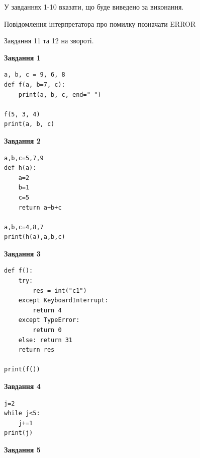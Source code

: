 \documentclass[12pt, ukrainian]{article}
\begin{document}
{{{{{{{{{У завданнях 1-10 вказати, що буде виведено за виконання.

Повідомлення інтерпретатора про помилку позначати ERROR

Завдання 11 та 12 на звороті.

\begin{minipage}[t]{7.5cm}

\begin{center}
\textbf{Завдання 1}
\end{center}

\begin{verbatim}
a, b, c = 9, 6, 8
def f(a, b=7, c):
    print(a, b, c, end=" ")

f(5, 3, 4)
print(a, b, c)
\end{verbatim}



\begin{center}
\textbf{Завдання 2}
\end{center}

\begin{verbatim}
a,b,c=5,7,9
def h(a):
    a=2
    b=1
    c=5
    return a+b+c

a,b,c=4,8,7
print(h(a),a,b,c)
\end{verbatim}



\begin{center}
\textbf{Завдання 3}
\end{center}

\begin{verbatim}
def f():
    try:
        res = int("c1")
    except KeyboardInterrupt: 
        return 4
    except TypeError: 
        return 0
    else: return 31
    return res

print(f())
\end{verbatim}



\begin{center}
\textbf{Завдання 4}
\end{center}

\begin{verbatim}
j=2
while j<5:
    j+=1
print(j)
\end{verbatim}

\end{minipage}
\vline \hspace{6mm}
\begin{minipage}[t]{10.5cm}

\begin{center}
\textbf{Завдання 5}
\end{center}


\end{minipage}}}}}}}}}}
\end{document}
